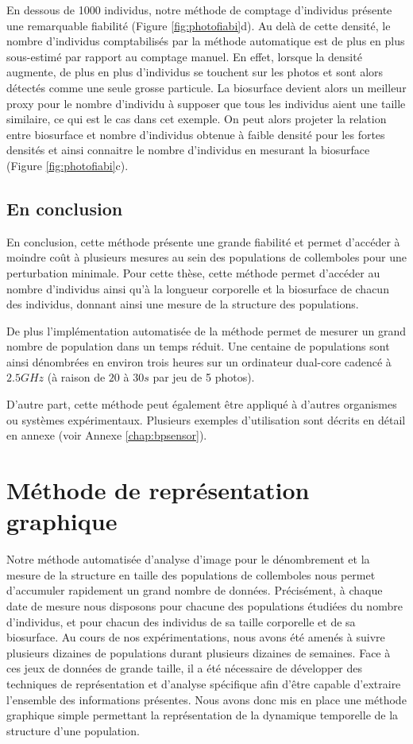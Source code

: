 En dessous de 1000 individus, notre méthode de comptage d'individus présente une
remarquable fiabilité (Figure \ref{fig:photofiabi}d). Au delà de cette densité,
le nombre d'individus comptabilisés par la méthode automatique est de plus en
plus sous-estimé par rapport au comptage manuel. En effet, lorsque la densité
augmente, de plus en plus d'individus se touchent sur les photos et sont alors
détectés comme une seule grosse particule. La biosurface devient alors un
meilleur proxy pour le nombre d'individu à supposer que tous les individus aient
une taille similaire, ce qui est le cas dans cet exemple. On peut alors projeter
la relation entre biosurface et nombre d'individus obtenue à faible densité pour
les fortes densités et ainsi connaitre le nombre d'individus en mesurant la
biosurface (Figure \ref{fig:photofiabi}c).

\subsection{En conclusion}

En conclusion, cette méthode présente une grande fiabilité et permet d'accéder à
moindre coût à plusieurs mesures au sein des populations de collemboles pour une
perturbation minimale. Pour cette thèse, cette méthode permet d'accéder au
nombre d'individus ainsi qu'à la longueur corporelle et la biosurface de chacun
des individus, donnant ainsi une mesure de la structure des populations. 

De plus l'implémentation automatisée de la méthode permet de mesurer un grand
nombre de population dans un temps réduit. Une centaine de populations sont
ainsi dénombrées en environ trois heures sur un ordinateur dual-core cadencé à
$2.5GHz$ (à raison de $20$ à $30s$ par jeu de 5 photos).

D'autre part, cette méthode peut également être appliqué à d'autres organismes
ou systèmes expérimentaux. Plusieurs exemples d'utilisation sont décrits en
détail en annexe (voir Annexe \ref{chap:bpsensor}).

\section{Méthode de représentation graphique}

Notre méthode automatisée d'analyse d'image pour le dénombrement et la mesure de
la structure en taille des populations de collemboles nous permet d'accumuler
rapidement un grand nombre de données. Précisément, à chaque date de mesure nous
disposons pour chacune des populations étudiées du nombre d'individus, et pour
chacun des individus de sa taille corporelle et de sa biosurface. Au cours
de nos expérimentations, nous avons été amenés à suivre plusieurs dizaines de
populations durant plusieurs dizaines de semaines. Face à ces jeux de données de
grande taille, il a été nécessaire de développer des techniques de
représentation et d'analyse spécifique afin d'être capable d'extraire l'ensemble
des informations présentes. Nous avons donc mis en place une méthode graphique
simple permettant la représentation de la dynamique temporelle de la structure
d'une population. 

